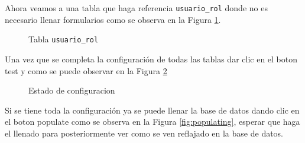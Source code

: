 Ahora veamos a una tabla que haga referencia \texttt{usuario\_rol} donde no es necesario llenar formularios como se observa en la Figura \ref{fillreferenced}.
\begin{figure}[H]
\caption{Tabla \texttt{usuario\_rol}}
\label{fillreferenced}
\centering
{}
\end{figure}
Una vez que se completa la configuraci\'on de todas las tablas dar clic en el boton test y como se puede observar en la Figura \ref{fig:statusConnection}
\begin{figure}[H]
\caption{Estado de configuracion}\label{fig:statusConnection}
\centering
{}
\end{figure}
 Si se tiene toda la configuraci\'on ya se puede llenar la base de datos dando clic en el boton populate como se observa en la Figura \ref{fig:populating}, esperar que haga el llenado para posteriormente ver como se ven reflajado en la base de datos.
 
